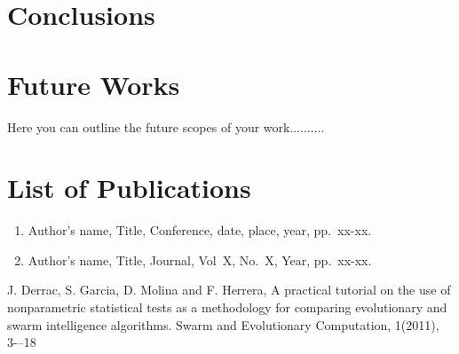 \documentclass[12pt]{report}
\begin{document}
\newpage

\chapter{Conclusions}

\newpage

\chapter{Future Works}
Here you can outline the future scopes of your work..........
\newpage

\chapter*{List of Publications}
\begin{enumerate}
\item Author's name, Title, Conference, date, place, year, pp.~xx-xx.
\item Author's name, Title, Journal, Vol~X, No.~X, Year, pp.~xx-xx.
\end{enumerate}
\newpage
\begin{thebibliography}{00}
J. Derrac, S. Garcia, D. Molina and  F. Herrera, A practical tutorial on the use of nonparametric statistical tests as a methodology for comparing evolutionary and swarm intelligence algorithms. Swarm and Evolutionary Computation, 1(2011), 3-–18
\end{thebibliography}
\end{document}
